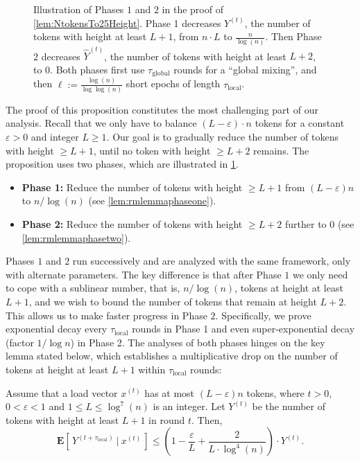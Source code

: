 \documentclass[twoside,leqno]{article}
\newcommand{\Ex}[1]{\mathbf{E} \left[\,#1\,\right]}
\DeclareMathOperator{\1}{\mathbf{1}}
\newcommand{\taulocal}{\tau_{\mathrm{local}}}
\newcommand{\tauglobal}{\tau_{\mathrm{global}}}
\numberwithin{equation}{section}
\let\epsilon\varepsilon
\newcommand{\newL}{L}
\begin{document}
\begin{figure}[ht]

\caption{Illustration of Phases $1$ and $2$ in the proof of \cref{lem:NtokensTo25Height}. Phase 1 decreases $Y^{(t)}$, the number of tokens with height at least $L+1$, from $n \cdot L$ to $\frac{n}{\log(n)}$. Then Phase 2 decreases $\widehat{Y}^{(t)}$, the number of tokens with height at least $L+2$, to $0$. Both phases first use $\tauglobal$ rounds for a ``global mixing'', and then $\ell:=\frac{\log(n)}{\log \log(n)}$ short epochs of length $\taulocal$.
}\label{fig:pro_illustration}

\end{figure}

The proof of this proposition constitutes the most challenging part of our analysis.
Recall that we only have to balance $(\newL-\epsilon) \cdot n$ tokens for a constant $\epsilon > 0$ and  integer $\newL \geq 1$. Our goal is to gradually reduce the number of tokens with height $\geq \newL+1$, until no token with height $\geq \newL+2$ remains. The proposition uses two phases, which are illustrated in \cref{fig:pro_illustration}. 
\begin{itemize}\itemsep0pt
\item \textbf{Phase 1:} Reduce the number of tokens with height $\geq \newL+1$ from $(\newL-\epsilon) n$ to $n/\log (n)$ (see \cref{lem:rmlemmaphaseone}).

\item \textbf{Phase 2:} Reduce the number of tokens with height $\geq \newL+2$ further to $0$ (see \cref{lem:rmlemmaphasetwo}). 
\end{itemize}

Phases $1$ and $2$ run successively and are analyzed with the same framework, only with alternate parameters. The key difference is that after Phase $1$ we only need to cope with a sublinear number, that is, $n/\log(n)$, tokens at height at least $L+1$, and we wish to bound the number of tokens that remain at height $L+2$. This allows us to make faster progress in Phase $2$. Specifically, we prove exponential decay every $\taulocal$ rounds in Phase 1 and even super-exponential decay (factor $1/\log n$) in Phase 2. 
The analyses of both phases hinges on the key lemma stated below, which establishes a multiplicative drop on the number of tokens at height at least $L+1$ within $\taulocal$ rounds:
\begin{lemma}\label{lem:keylemma}
Assume that a load vector $x^{(t)}$ has at most $(\newL-\epsilon) n$ tokens, where $t > 0$, $0<\epsilon < 1$ and $1 \leq \newL \leq \log^7(n)$ is an integer. Let $Y^{(t)}$ be the number of tokens with height at least $L+1$ in round $t$. 
Then,
\[ \Ex{ Y^{(t+\taulocal)} ~\Big|~ x^{(t)} } \le
\left( 1 - \frac{\epsilon}{\newL } + \frac{2}{\newL \cdot \log^4(n)} \right)
\cdot Y^{(t)}.
\]
\end{lemma}
\end{document}
